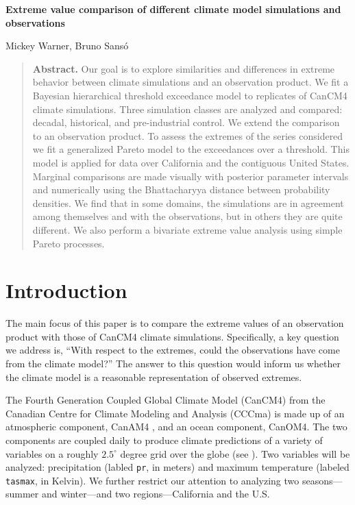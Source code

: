\begin{Large}
\noindent \textbf{Extreme value comparison of different climate model simulations and observations}
\end{Large}
\bigskip

\noindent Mickey Warner, Bruno Sans{\'o}


\bigskip
\bigskip
\begin{quote}
\textbf{Abstract.} Our goal is to explore similarities and differences in extreme behavior between climate simulations and an observation product. We fit a Bayesian hierarchical threshold exceedance model to replicates of CanCM4 climate simulations. Three simulation classes are analyzed and compared: decadal, historical, and pre-industrial control. We extend the comparison to an observation product. To assess the extremes of the series considered we fit a generalized Pareto model to the exceedances over a threshold. This model is applied for data over California and the contiguous United States. Marginal comparisons are made visually with posterior parameter intervals and numerically using the Bhattacharyya distance between probability densities. We find that in some domains, the simulations are in agreement among themselves and with the observations, but in others they are quite different. We also perform a bivariate extreme value analysis using simple Pareto processes.
\end{quote}

\section{Introduction}
\label{intro}

The main focus of this paper is to compare the extreme values of an observation product with those of CanCM4 climate simulations. Specifically, a key question we address is, ``With respect to the extremes, could the observations have come from the climate model?'' The answer to this question would inform us whether the climate model is a reasonable representation of observed extremes.

The Fourth Generation Coupled Global Climate Model (CanCM4) from the Canadian Centre for Climate Modeling and Analysis (CCCma) is made up of an atmospheric component, CanAM4 \citep{von2013canadian}, and an ocean component, CanOM4. The two components are coupled daily to produce climate predictions of a variety of variables on a roughly $2.5^\circ$ degree grid over the globe (see \cite{merryfield2013canadian}). Two variables will be analyzed: precipitation (labled \texttt{pr}, in meters) and maximum temperature (labeled \texttt{tasmax}, in Kelvin). We further restrict our attention to analyzing two seasons---summer and winter---and two regions---California and the U.S.

